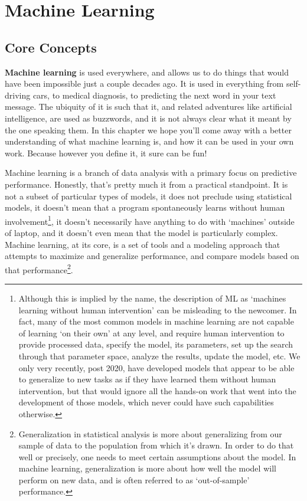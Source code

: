 \documentclass[
  letterpaper,
]{krantz}
\begin{document}
\part{Machine Learning}

\chapter{Core Concepts}\label{sec-ml-core-concepts}

\textbf{Machine learning} is used everywhere, and allows us to do things
that would have been impossible just a couple decades ago. It is used in
everything from self-driving cars, to medical diagnosis, to predicting
the next word in your text message. The ubiquity of it is such that it,
and related adventures like artificial intelligence, are used as
buzzwords, and it is not always clear what it meant by the one speaking
them. In this chapter we hope you'll come away with a better
understanding of what machine learning is, and how it can be used in
your own work. Because however you define it, it sure can be fun!

Machine learning is a branch of data analysis with a primary focus on
predictive performance. Honestly, that's pretty much it from a practical
standpoint. It is not a subset of particular types of models, it does
not preclude using statistical models, it doesn't mean that a program
spontaneously learns without human involvement\footnote{Although this is
  implied by the name, the description of ML as `machines learning
  without human intervention' can be misleading to the newcomer. In
  fact, many of the most common models in machine learning are not
  capable of learning `on their own' at any level, and require human
  intervention to provide processed data, specify the model, its
  parameters, set up the search through that parameter space, analyze
  the results, update the model, etc. We only very recently, post 2020,
  have developed models that appear to be able to generalize to new
  tasks as if they have learned them without human intervention, but
  that would ignore all the hands-on work that went into the development
  of those models, which never could have such capabilities otherwise.},
it doesn't necessarily have anything to do with `machines' outside of
laptop, and it doesn't even mean that the model is particularly complex.
Machine learning, at its core, is a set of tools and a modeling approach
that attempts to maximize and generalize performance, and compare models
based on that performance\footnote{Generalization in statistical
  analysis is more about generalizing from our sample of data to the
  population from which it's drawn. In order to do that well or
  precisely, one needs to meet certain assumptions about the model. In
  machine learning, generalization is more about how well the model will
  perform on new data, and is often referred to as `out-of-sample'
  performance.}.
\end{document}
